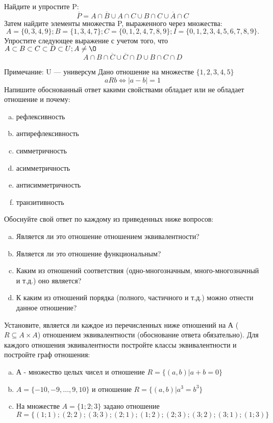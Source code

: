 \documentclass[10pt]{exam}
\begin{document}
\begin{questions}
\question
Найдите и упростите P:
\begin{equation*}
\overline{P} = A \cap \overline{B} \cup A \cap C \cup B \cap C \cup \overline{A} \cap C
\end{equation*}
Затем найдите элементы множества P, выраженного через множества:
\begin{equation*}
A = \{0, 3, 4, 9\}; 
B = \{1, 3, 4, 7\};
C = \{0, 1, 2, 4, 7, 8, 9\};
I = \{0, 1, 2, 3, 4, 5, 6, 7, 8, 9\}.
\end{equation*}\question
Упростите следующее выражение с учетом того, что $A\subset B \subset C \subset D \subset U; A \neq \O$
\begin{equation*}
A \cap B  \cap \overline{C} \cup \overline{C} \cap D \cup B \cap C \cap D
\end{equation*}

Примечание: U — универсум\question
Дано отношение на множестве $\{1, 2, 3, 4, 5\}$ 
\begin{equation*}
aRb \iff |a-b| = 1
\end{equation*}
Напишите обоснованный ответ какими свойствами обладает или не обладает отношение и почему:   
\begin{enumerate} [a)]\setcounter{enumi}{0}
\item рефлексивность
\item антирефлексивность
\item симметричность
\item асимметричность
\item антисимметричность
\item транзитивность
\end{enumerate}

Обоснуйте свой ответ по каждому из приведенных ниже вопросов:
\begin{enumerate} [a)]\setcounter{enumi}{0}
    \item Является ли это отношение отношением эквивалентности?
    \item Является ли это отношение функциональным?
    \item Каким из отношений соответствия (одно-многозначным, много-многозначный и т.д.) оно является?
    \item К каким из отношений порядка (полного, частичного и т.д.) можно отнести данное отношение?
\end{enumerate}

\question
Установите, является ли каждое из перечисленных ниже отношений на А ($R \subseteq A \times A$) отношением эквивалентности (обоснование ответа обязательно). Для каждого отношения эквивалентности 
постройте классы эквивалентности и постройте граф отношения:
\begin{enumerate}[a)]\setcounter{enumi}{0}
\item А - множество целых чисел и отношение $R = \{(a,b)|a + b = 0\}$
\item $A = \{-10, -9, …, 9, 10\}$ и отношение $R = \{(a,b)|a^{3} = b^{3}\}$
\item На множестве $A = \{1; 2; 3\}$ задано отношение $R = \{(1; 1); (2; 2); (3; 3); (2; 1); (1; 2); (2; 3); (3; 2); (3; 1); (1; 3)\}$


\end{enumerate}
\end{questions}
\end{document}

